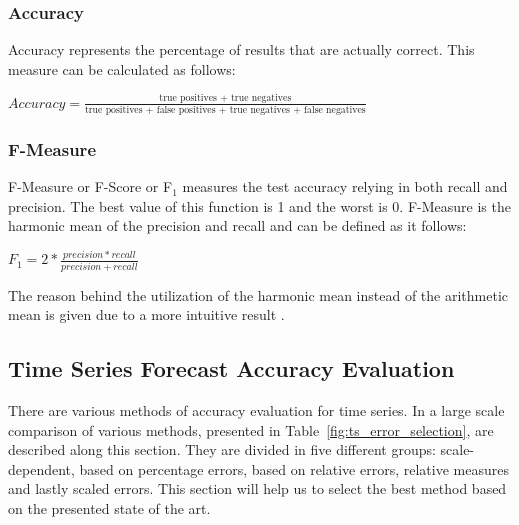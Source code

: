 \subsubsection{Accuracy}

Accuracy represents the percentage of results that are actually correct. This
measure can be calculated as follows:

\begin{center} \Large \begin{math} Accuracy = \frac{\text{true positives + true
negatives}}{\text{true positives + false positives + true negatives + false
negatives}} \end{math} \normalsize \end{center}


\subsubsection{F-Measure}

F-Measure or F-Score or F\begin{math}_1 \end{math} measures the test accuracy
  relying in both recall and precision. The best value of this function is 1 and
  the worst is 0. F-Measure is the harmonic mean of the precision and recall and
  can be defined as it follows:

\begin{center} \Large \begin{math} F_1 = 2 *
\frac{precision*recall}{precision+recall} \end{math} \normalsize \end{center}

The reason behind the utilization of the harmonic mean instead of the arithmetic
mean is given due to a more intuitive result \cite{sasaki2007truth}. \\

\subsection{Time Series Forecast Accuracy Evaluation}

There are various methods of accuracy evaluation for time series. In
\cite{Hyndman2006679} a large scale comparison of various methods, presented in
Table~\ref{fig:ts_error_selection}, are described along this section. They are
divided in five different groups: scale-dependent, based on percentage errors,
based on relative errors, relative measures and lastly scaled errors.
This section will help us to select the best method based on the presented state
of the art.

